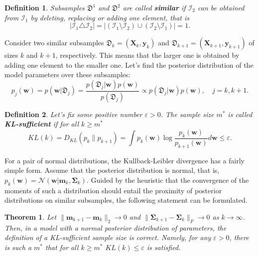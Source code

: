 \documentclass[sn-mathphys-num]{sn-jnl}%
\newtheorem{theorem}{Theorem}%
\newtheorem{definition}{Definition}%
\begin{document}
\begin{definition}
    Subsamples $\mathfrak{D}^1$ and $\mathfrak{D}^2$ are called \textbf{similar} if $\mathcal{I}_2$ can be obtained from $\mathcal{I}_1$ by deleting, replacing or adding one element, that is
    \[ \left| \mathcal{I}_1 \triangle \mathcal{I}_2 \right| = \left| \left( \mathcal{I}_1 \setminus \mathcal{I}_2 \right) \cup \left( \mathcal{I}_2 \setminus \mathcal{I}_1 \right) \right| = 1. \]
\end{definition}

Consider two similar subsamples $\mathfrak{D}_k = (\mathbf{X}_k,\mathbf{y}_k)$ and $\mathfrak{D}_{k+1} = (\mathbf{X}_{k+1}, \mathbf{y}_{k+1})$ of sizes $k$ and $k+1$, respectively. This means that the larger one is obtained by adding one element to the smaller one. Let's find the posterior distribution of the model parameters over these subsamples:
\[p_j(\mathbf{w}) = p(\mathbf{w} | \mathfrak{D}_j) = \frac{p(\mathfrak{D}_j | \mathbf{w}) p(\mathbf{w})}{p(\mathfrak{D}_j)} \propto p(\mathfrak{D}_j | \mathbf{w}) p(\mathbf{w}), \quad j = k, k+1. \]

\begin{definition}
    Let's fix some positive number $\varepsilon > 0$. The sample size $m^*$ is called \textbf{KL-sufficient} if for all $k\geqslant m^*$
    \[ KL(k) = D_{KL}(p_k \| p_{k+1}) = \int p_k(\mathbf{w}) \log{\frac{p_k(\mathbf{w})}{p_{k+1}(\mathbf{w})}} d\mathbf{w} \leqslant \varepsilon. \]
\end{definition}

For a pair of normal distributions, the Kullback-Leibler divergence has a fairly simple form. Assume that the posterior distribution is normal, that is, $p_k(\mathbf{w}) = \mathcal{N}\left(\mathbf{w}|\mathbf{m}_k, \mathbf{\Sigma}_k\right)$. Guided by the heuristic that the convergence of the moments of such a distribution should entail the proximity of posterior distributions on similar subsamples, the following statement can be formulated.

\begin{theorem}\label{theorem1}
    Let $\|\mathbf{m}_{k+1} - \mathbf{m}_k\|_2 \to 0$ and $\|\mathbf{\Sigma}_{k+1} - \mathbf{\Sigma}_k\|_{F}\to 0$ as $k\to \infty$. Then, in a model with a normal posterior distribution of parameters, the definition of a KL-sufficient sample size is correct. Namely, for any $\varepsilon > 0$, there is such a $m^*$ that for all $k\geqslant m^*$ $KL(k)\leqslant\varepsilon$ is satisfied.
\end{theorem}
\end{document}
